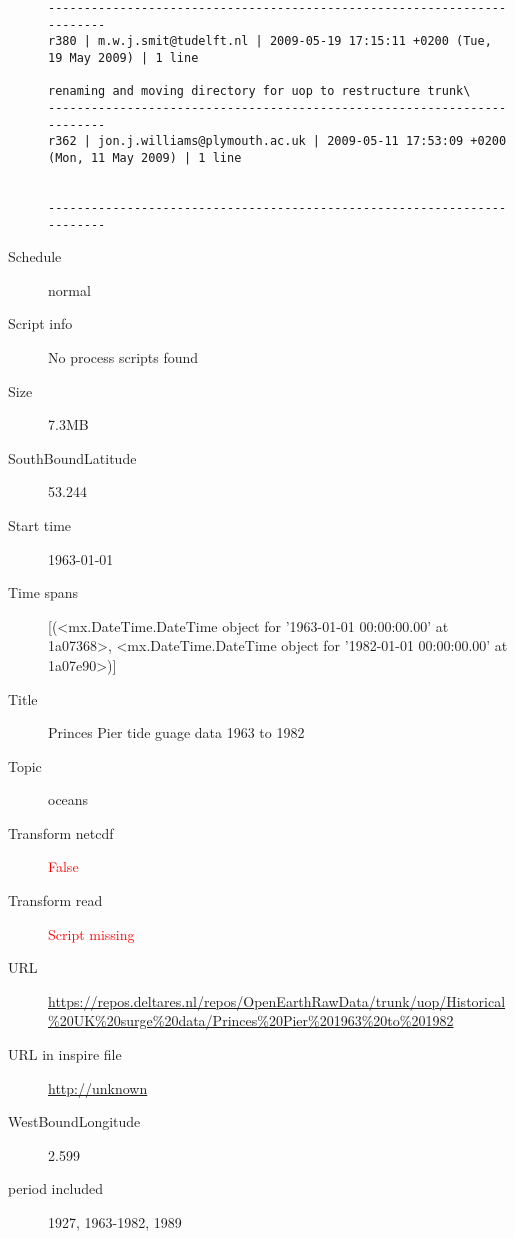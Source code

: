\documentclass[9]{report}
\begin{document}
\begin{description}
\begin{verbatim}
------------------------------------------------------------------------
r380 | m.w.j.smit@tudelft.nl | 2009-05-19 17:15:11 +0200 (Tue, 19 May 2009) | 1 line

renaming and moving directory for uop to restructure trunk\
------------------------------------------------------------------------
r362 | jon.j.williams@plymouth.ac.uk | 2009-05-11 17:53:09 +0200 (Mon, 11 May 2009) | 1 line


------------------------------------------------------------------------

\end{verbatim}
  \item[Schedule] normal
  \item[Script info] No process scripts found
  \item[Size] 7.3MB
  \item[SouthBoundLatitude] 53.244
  \item[Start time] 1963-01-01
  \item[Time spans] [(<mx.DateTime.DateTime object for '1963-01-01 00:00:00.00' at 1a07368>, <mx.DateTime.DateTime object for '1982-01-01 00:00:00.00' at 1a07e90>)]
  \item[Title]  Princes Pier tide guage data 1963 to 1982 
  \item[Topic] oceans
  \item[Transform netcdf] \textcolor{red}{False}
  \item[Transform read] \textcolor{red}{Script missing}
  \item[URL] \href{https://repos.deltares.nl/repos/OpenEarthRawData/trunk/uop/Historical\%20UK\%20surge\%20data/Princes\%20Pier\%201963\%20to\%201982}{https://repos.deltares.nl/repos/OpenEarthRawData/trunk/uop/Historical\%20UK\%20surge\%20data/Princes\%20Pier\%201963\%20to\%201982}
  \item[URL in inspire file] \href{http://unknown}{http://unknown}
  \item[WestBoundLongitude] 2.599
  \item[period included] 1927, 1963-1982, 1989
\end{description}
\end{document}
